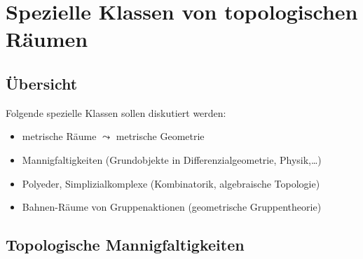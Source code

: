 \chapter{Spezielle Klassen von topologischen Räumen}

\section{Übersicht}

Folgende spezielle Klassen sollen diskutiert werden:
\begin{itemize}
  \item metrische Räume \( \leadsto \) metrische Geometrie
  \item Mannigfaltigkeiten (Grundobjekte in Differenzialgeometrie, Physik,\dots)
  \item Polyeder, Simplizialkomplexe (Kombinatorik, algebraische Topologie)
  \item Bahnen-Räume von Gruppenaktionen (geometrische Gruppentheorie)
\end{itemize}

\section{Topologische Mannigfaltigkeiten}

